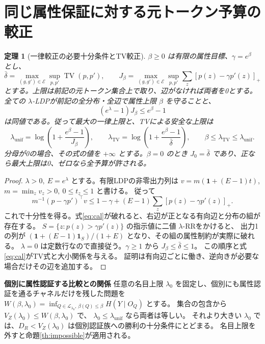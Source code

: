 \documentclass[a4paper,11pt]{ltjsarticle}
\theoremstyle{jp}
\newtheorem{thm}{定理}
\newcommand{\ind}{\mathbf 1}
\newcommand{\TV}{\operatorname{TV}}
\newcommand{\Dc}{D_R}
\newcommand{\V}{V_Z}
\newcommand{\cL}{\mathcal L}
\newcommand{\para}[1]{\par\Needspace{3\baselineskip}\addvspace{.6\baselineskip}\noindent\textbf{#1}\enspace}
\begin{document}
\section{同じ属性保証に対する元トークン予算の較正}

\begin{thm}[一律較正の必要十分条件とTV較正]\label{th:cal}
\(\beta\ge0\) は有限の属性目標、\(\gamma=e^\beta\) とし、
\[
 \bar\delta=\max_{(g,g')\in\mathcal E}\sup_{p,p'}\TV(p,p'),\qquad
 J_\beta=\max_{(g,g')\in\mathcal E}\sup_{p,p'}\sum_z[p(z)-\gamma p'(z)]_+
\]
とする。上限は前記の元トークン集合上で取り、辺がなければ両者を0とする。
\emph{全ての} \(\lambda\)-LDPが前記の全分布・全辺で属性上限 \(\beta\) を守ることと、
\[
 (e^\lambda-1)J_\beta\le e^\beta-1
 \tag{11}\label{eq:cal}
\]
は同値である。従って最大の一律上限と、TVによる安全な上限は
\[
 \lambda_{\mathrm{unif}}=\log\!\left(1+\frac{e^\beta-1}{J_\beta}\right),\qquad
 \lambda_{\mathrm{TV}}=\log\!\left(1+\frac{e^\beta-1}{\bar\delta}\right),
 \qquad \beta\le\lambda_{\mathrm{TV}}\le\lambda_{\mathrm{unif}}.
\]
分母が0の場合、その式の値を \(+\infty\) とする。\(\beta=0\) のとき
\(J_0=\bar\delta\) であり、正なら最大上限は0、ゼロなら全予算が許される。
\end{thm}
\begin{proof}
\(\lambda>0,\ E=e^\lambda\) とする。有限LDPの非零出力列は
\(v=m(\mathbf1+(E-1)t)\), \(m=\min_z v_z>0,\ 0\le t_z\le1\) と書ける。
従って
\[
 m^{-1}(p-\gamma p')^\top v
 \le 1-\gamma+(E-1)\sum_z[p(z)-\gamma p'(z)]_+ .
\]
これで十分性を得る。式\eqref{eq:cal}が破れると、右辺が正となる有向辺と分布の組が存在する。
\(S=\{z:p(z)>\gamma p'(z)\}\) の指示値に二値 \(\lambda\)-RRをかけると、
出力1の列が \((\mathbf1+(E-1)\ind_S)/(1+E)\) となり、その組の属性制約が実際に破れる。
\(\lambda=0\) は定数行なので直接従う。\(\gamma\ge1\) から \(J_\beta\le\bar\delta\le1\)。
この順序と式\eqref{eq:cal}がTV式と大小関係を与える。
証明は有向辺ごとに働き、逆向きが必要な場合だけその辺を追加する。\cite{spr}
\end{proof}

\para{個別に属性認証する比較との関係}
任意の名目上限 \(\lambda_0\) を固定し、個別にも属性認証を通るチャネルだけを残した問題を
\(W(\beta,\lambda_0)=\inf_{Q\in\cL_{\lambda_0},\,\beta(Q)\le\beta}H(Y\mid O_Q)\) とする。
集合の包含から \(\V(\lambda_0)\le W(\beta,\lambda_0)\) で、
\(\lambda_0\le\lambda_{\mathrm{unif}}\) なら両者は等しい。
それより大きい \(\lambda_0\) では、\(\Dc<\V(\lambda_0)\) は個別認証族への勝利の十分条件にとどまる。
名目上限を外すと命題\ref{th:impossible}が適用される。
\end{document}
